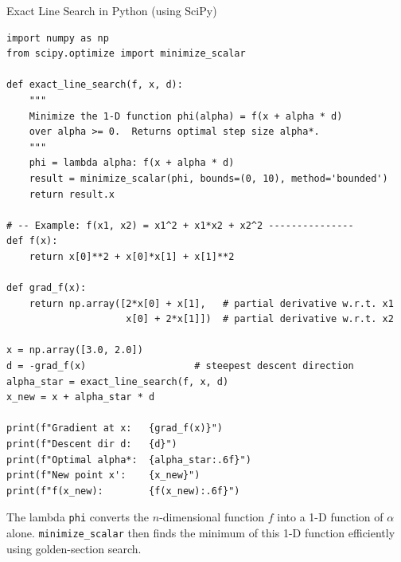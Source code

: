\documentclass[aspectratio=169,10pt]{beamer}
\begin{document}
\begin{frame}[fragile]{Exact Line Search in Python (using SciPy)}

\begin{lstlisting}[style=pycode]
import numpy as np
from scipy.optimize import minimize_scalar

def exact_line_search(f, x, d):
    """
    Minimize the 1-D function phi(alpha) = f(x + alpha * d)
    over alpha >= 0.  Returns optimal step size alpha*.
    """
    phi = lambda alpha: f(x + alpha * d)
    result = minimize_scalar(phi, bounds=(0, 10), method='bounded')
    return result.x

# -- Example: f(x1, x2) = x1^2 + x1*x2 + x2^2 ---------------
def f(x):
    return x[0]**2 + x[0]*x[1] + x[1]**2

def grad_f(x):
    return np.array([2*x[0] + x[1],   # partial derivative w.r.t. x1
                     x[0] + 2*x[1]])  # partial derivative w.r.t. x2

x = np.array([3.0, 2.0])
d = -grad_f(x)                   # steepest descent direction
alpha_star = exact_line_search(f, x, d)
x_new = x + alpha_star * d

print(f"Gradient at x:   {grad_f(x)}")
print(f"Descent dir d:   {d}")
print(f"Optimal alpha*:  {alpha_star:.6f}")
print(f"New point x':    {x_new}")
print(f"f(x_new):        {f(x_new):.6f}")
\end{lstlisting}

\medskip
The lambda \texttt{phi} converts the $n$-dimensional function $f$ into
a 1-D function of $\alpha$ alone.  \texttt{minimize\_scalar} then finds
the minimum of this 1-D function efficiently using golden-section search.

\end{frame}
\end{document}

